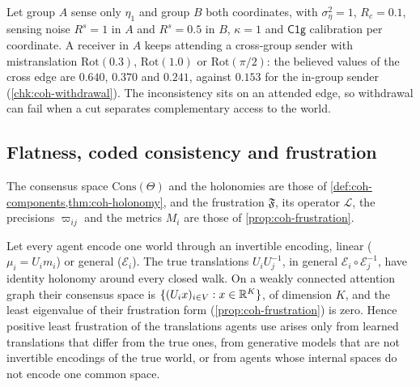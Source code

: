 \begin{example}\label{ex:coh-unique-information}
Let group $A$ sense only $\eta_1$ and group $B$ both coordinates, with $\sigma_\eta^2=1$, $R_c=0.1$, sensing noise $R^s=1$ in $A$ and $R^s=0.5$ in $B$, $\kappa=1$ and $\mathsf{C1g}$ calibration per coordinate. A receiver in $A$ keeps attending a cross-group sender with mistranslation $\mathrm{Rot}(0.3)$, $\mathrm{Rot}(1.0)$ or $\mathrm{Rot}(\pi/2)$: the believed values of the cross edge are $0.640$, $0.370$ and $0.241$, against $0.153$ for the in-group sender (\cref{chk:coh-withdrawal}). The inconsistency sits on an attended edge, so withdrawal can fail when a cut separates complementary access to the world.
\end{example}

\subsection{Flatness, coded consistency and frustration}\label{sup:coh-flatness-coded-consistency-and-frustrati}

The consensus space $\mathrm{Cons}(\Theta)$ and the holonomies are those of \cref{def:coh-components,thm:coh-holonomy}, and the frustration $\mathfrak F$, its operator $\mathcal L$, the precisions $\varpi_{ij}$ and the metrics $M_i$ are those of \cref{prop:coh-frustration}.

\begin{proposition}\label{prop:coh-flat-true}
Let every agent encode one world through an invertible encoding, linear ($\mu_i=U_im_i$) or general ($\mathcal E_i$). The true translations $U_iU_j^{-1}$, in general $\mathcal E_i\circ\mathcal E_j^{-1}$, have identity holonomy around every closed walk. On a weakly connected attention graph their consensus space is $\{(U_ix)_{i\in V}:x\in\mathbb{R}^K\}$, of dimension $K$, and the least eigenvalue of their frustration form (\cref{prop:coh-frustration}) is zero. Hence positive least frustration of the translations agents use arises only from learned translations that differ from the true ones, from generative models that are not invertible encodings of the true world, or from agents whose internal spaces do not encode one common space.
\end{proposition}

